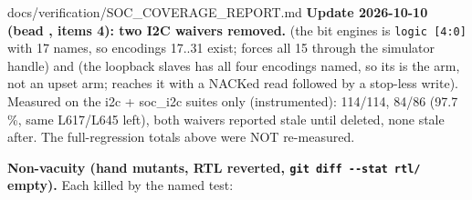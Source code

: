 \begin{relocated}{docs/verification/SOC_COVERAGE_REPORT.md}
\textbf{Update 2026-10-10 (bead , items 4): two I2C
 waivers removed.}   (the
bit engine\textquotesingle s  is
\texttt{logic\ [4:\allowbreak{}0]} with 17 names, so encodings 17..31
exist;  forces all 15
through the simulator handle) and   (the
loopback slave\textquotesingle s  has all four
encodings named, so its  is the  arm, not
an upset arm;  reaches it
with a NACKed read followed by a stop-less write). Measured on the i2c +
soc\_i2c suites only (instrumented):  114/114,
 84/86 (97.7 \%, same L617/L645 left), both waivers
reported stale until deleted, none stale after. The full-regression
totals above were NOT re-measured.

\textbf{Non-vacuity (hand mutants, RTL reverted,
\texttt{git\ diff\ -\allowbreak{}-\allowbreak{}stat\ rtl/\allowbreak{}}
empty).} Each killed by the named test:

{\footnotesize\setlength{\tabcolsep}{3pt}

}
\end{relocated}
